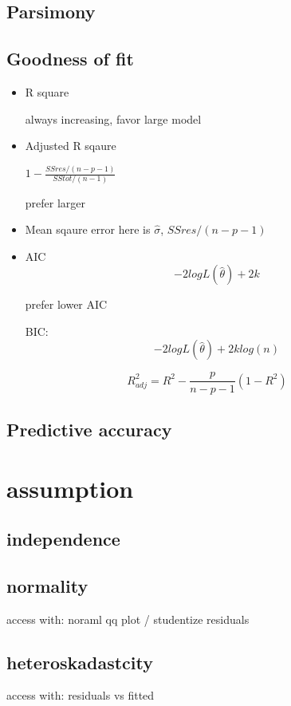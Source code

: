 \documentclass[10pt]{article}
\theoremstyle{break}
\begin{document}
            \subsection{Parsimony}
            \subsection{Goodness of fit}
                \begin{itemize}
                    \item R square 

                        always increasing, favor large model
                    \item Adjusted R sqaure 

                        $1-\frac{SSres/(n-p-1)}{SStot/(n-1)}$

                        prefer larger 

                    \item Mean sqaure error 
                        here is $\hat\sigma$, $SSres/(n-p-1)$
                    \item AIC
                        $$-2logL(\hat \theta)+2k$$

                        prefer lower AIC

                        BIC:
                        $$-2logL(\hat \theta)+2klog(n)$$
                \end{itemize}

            $$R^2_{adj}=R^2-\frac{p}{n-p-1}(1-R^2)$$
            \subsection{Predictive accuracy}

            \section{assumption}
            \subsection{independence}
            \subsection{normality}
            access with: noraml qq plot / studentize residuals


            \subsection{heteroskadastcity}
            access with: residuals vs fitted 
\end{document}
